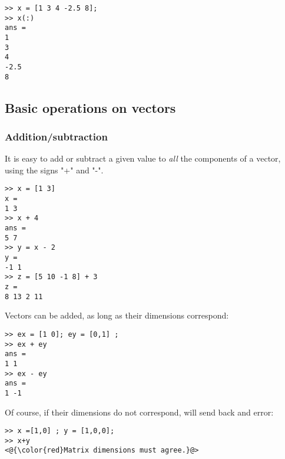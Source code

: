 \begin{lstlisting}
>> x = [1 3 4 -2.5 8];
>> x(:)
ans = 
1
3
4
-2.5
8
\end{lstlisting}




\subsection{Basic operations on vectors}
\subsubsection{Addition/subtraction}
It is easy to add or subtract a given value to \emph{all} the components of a vector, using the signs "+" and "-".

\begin{lstlisting}
>> x = [1 3]
x = 
1 3
>> x + 4
ans =
5 7
>> y = x - 2
y =
-1 1
>> z = [5 10 -1 8] + 3
z = 
8 13 2 11
\end{lstlisting}


Vectors can be added, as long as their dimensions correspond:

\begin{lstlisting}
>> ex = [1 0]; ey = [0,1] ;
>> ex + ey
ans =
1 1
>> ex - ey
ans =
1 -1
\end{lstlisting}

Of course, if their dimensions do not correspond, \matlab will send back and error:

\begin{lstlisting}
>> x =[1,0] ; y = [1,0,0];
>> x+y
<@{\color{red}Matrix dimensions must agree.}@>
\end{lstlisting}




